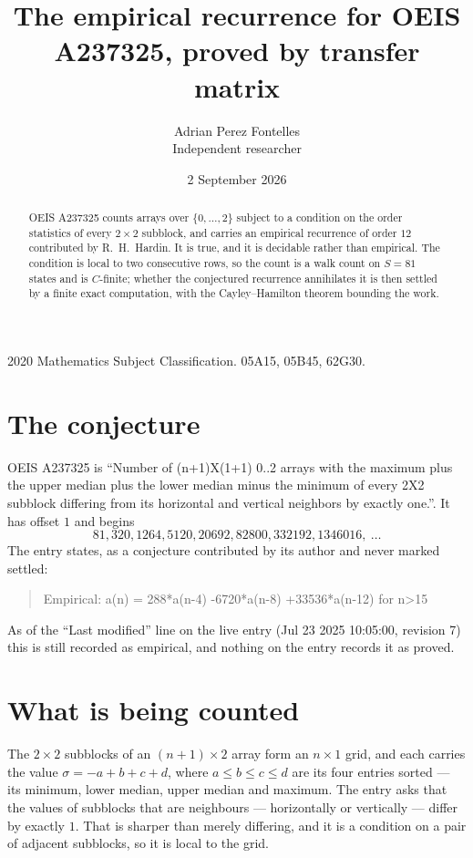 \documentclass[11pt,a4paper]{article}
\title{The empirical recurrence for OEIS A237325, proved by transfer matrix}
\author{Adrian Perez Fontelles\\ \small Independent researcher}
\date{2 September 2026}
\theoremstyle{plain}
\theoremstyle{definition}
\begin{document}
\maketitle

\begin{abstract}
OEIS A237325 counts arrays over $\{0,\dots,2\}$ subject to a condition on the order
statistics of every $2\times2$ subblock, and carries an empirical recurrence of order
$12$ contributed by R.~H.~Hardin. It is true, and it is decidable rather than empirical.
The condition is local to two consecutive rows, so the count is a walk count on $S=81$
states and is $C$-finite; whether the conjectured recurrence annihilates it is then settled by
a finite exact computation, with the Cayley--Hamilton theorem bounding the work.
\end{abstract}

\noindent\small 2020 Mathematics Subject Classification. 05A15, 05B45, 62G30.\normalsize

\section{The conjecture}

OEIS A237325 is ``Number of (n+1)X(1+1) 0..2 arrays with the maximum plus the upper median plus the lower median minus the minimum of every 2X2 subblock differing from its horizontal and vertical neighbors by exactly one.''. It has offset $1$ and begins
\[
81, 320, 1264, 5120, 20692, 82800, 332192, 1346016,\ \dots
\]
The entry states, as a conjecture contributed by its author and never marked settled:
\begin{quote}
Empirical: a(n) = 288*a(n-4) -6720*a(n-8) +33536*a(n-12) for n>15
\end{quote}
As of the ``Last modified'' line on the live entry (Jul 23 2025 10:05:00, revision 7) this is still
recorded as empirical, and nothing on the entry records it as proved.

\section{What is being counted}

The $2\times2$ subblocks of an $(n+1)\times2$ array form an
$n\times1$ grid, and each carries the value $\sigma=-a+b+c+d$, where $a\le b\le c\le d$ are its four entries sorted --- its minimum, lower median, upper median and maximum. The entry asks that the values of
subblocks that are neighbours --- horizontally or vertically --- differ by exactly $1$.
That is sharper than merely differing, and it is a condition on a pair of adjacent subblocks,
so it is local to the grid.
\end{document}

